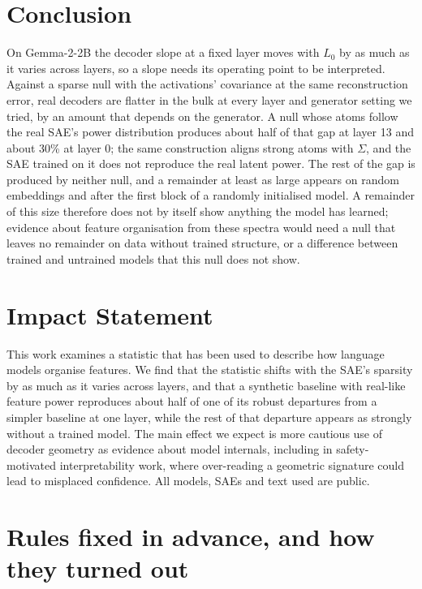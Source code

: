 \documentclass{article}
\newcommand{\Sig}{\Sigma}
\newcommand{\Lz}{L_0}
\begin{document}
\section{Conclusion}

On Gemma-2-2B the decoder slope at a fixed layer moves with $\Lz$ by as much as it varies across layers, so a slope needs its operating point to be interpreted. Against a sparse null with the activations' covariance at the same reconstruction error, real decoders are flatter in the bulk at every layer and generator setting we tried, by an amount that depends on the generator. A null whose atoms follow the real SAE's power distribution produces about half of that gap at layer 13 and about 30\% at layer 0; the same construction aligns strong atoms with $\Sig$, and the SAE trained on it does not reproduce the real latent power. The rest of the gap is produced by neither null, and a remainder at least as large appears on random embeddings and after the first block of a randomly initialised model. A remainder of this size therefore does not by itself show anything the model has learned; evidence about feature organisation from these spectra would need a null that leaves no remainder on data without trained structure, or a difference between trained and untrained models that this null does not show.

\section*{Impact Statement}

This work examines a statistic that has been used to describe how language models organise features. We find that the statistic shifts with the SAE's sparsity by as much as it varies across layers, and that a synthetic baseline with real-like feature power reproduces about half of one of its robust departures from a simpler baseline at one layer, while the rest of that departure appears as strongly without a trained model. The main effect we expect is more cautious use of decoder geometry as evidence about model internals, including in safety-motivated interpretability work, where over-reading a geometric signature could lead to misplaced confidence. All models, SAEs and text used are public.




\appendix
\onecolumn

\section{Rules fixed in advance, and how they turned out}
\label{app:prereg}
\end{document}

